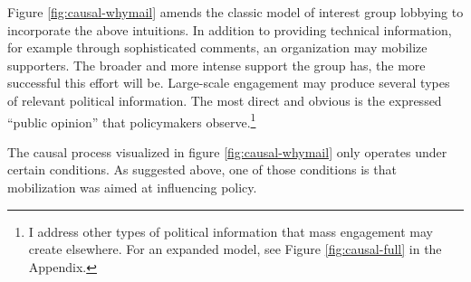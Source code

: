 Figure \ref{fig:causal-whymail} amends the classic model of interest group lobbying to incorporate the above intuitions. In addition to providing technical information, for example through sophisticated comments, an organization may mobilize supporters. The broader and more intense support the group has, the more successful this effort will be. Large-scale engagement may produce several types of relevant political information. The most direct and obvious is the expressed ``public opinion'' that policymakers observe.\footnote{I address other types of political information that mass engagement may create elsewhere. For an expanded model, see Figure \ref{fig:causal-full} in the Appendix.}



The causal process visualized in figure \ref{fig:causal-whymail} only operates under certain conditions. 
As suggested above, one of those conditions is that mobilization was aimed at influencing policy. 
